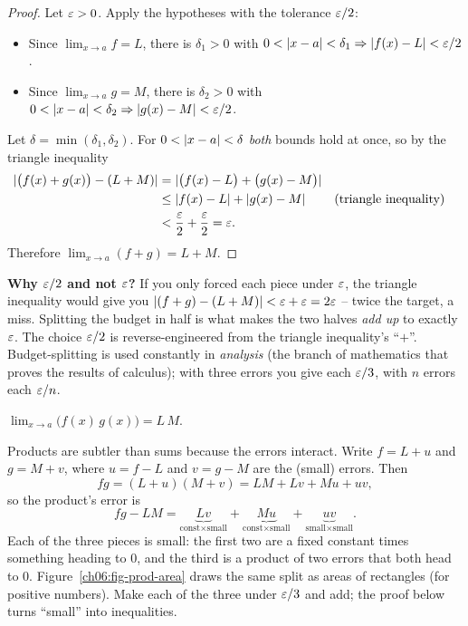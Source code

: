 \begin{proof}
Let $\varepsilon>0$. Apply the hypotheses with the tolerance $\varepsilon/2$:
\begin{itemize}
\item Since $\lim_{x\to a}f=L$, there is $\delta_1>0$ with
  $0<\lvert x-a\rvert<\delta_1 \Rightarrow \lvert f(x)-L\rvert<\varepsilon/2$.
\item Since $\lim_{x\to a}g=M$, there is $\delta_2>0$ with
  $0<\lvert x-a\rvert<\delta_2 \Rightarrow \lvert g(x)-M\rvert<\varepsilon/2$.
\end{itemize}
Let $\delta=\min(\delta_1,\delta_2)$. For $0<\lvert x-a\rvert<\delta$ \emph{both} bounds
hold at once, so by the triangle inequality
\begin{align*}
  \lvert\big(f(x)+g(x)\big)-(L+M)\rvert
  &= \lvert\big(f(x)-L\big)+\big(g(x)-M\big)\rvert \\
  &\le \lvert f(x)-L\rvert+\lvert g(x)-M\rvert && \text{(triangle inequality)} \\
  &< \frac{\varepsilon}{2}+\frac{\varepsilon}{2} = \varepsilon.
\end{align*}
Therefore $\lim_{x\to a}(f+g)=L+M$.
\end{proof}

\begin{trapbox}
\textbf{Why $\varepsilon/2$ and not $\varepsilon$?} If you only forced each piece under $\varepsilon$,
the triangle inequality would give you $\lvert(f+g)-(L+M)\rvert < \varepsilon+\varepsilon = 2\varepsilon$ --
twice the target, a miss. Splitting the budget in half is what makes the two
halves \emph{add up} to exactly $\varepsilon$. The choice $\varepsilon/2$ is reverse-engineered
from the triangle inequality's ``$+$''. Budget-splitting is used constantly in
\emph{analysis} (the branch of mathematics that proves the results of calculus);
with three errors you give each $\varepsilon/3$, with $n$ errors each $\varepsilon/n$.
\end{trapbox}

\begin{theorem}
\label{ch06:thm-prod}
$\displaystyle \lim_{x\to a}\big(f(x)\,g(x)\big) = L\,M.$
\end{theorem}

\begin{intuitionbox}
Products are subtler than sums because the errors interact. Write $f = L + u$ and
$g = M + v$, where $u=f-L$ and $v=g-M$ are the (small) errors. Then
\[
  fg = (L+u)(M+v) = LM + Lv + Mu + uv,
\]
so the product's error is
\[
  fg - LM = \underbrace{Lv}_{\text{const}\times\text{small}}
  + \underbrace{Mu}_{\text{const}\times\text{small}}
  + \underbrace{uv}_{\text{small}\times\text{small}}.
\]
Each of the three pieces is small: the first two are a fixed constant times
something heading to $0$, and the third is a product of two errors that both
head to $0$. Figure~\ref{ch06:fig-prod-area} draws the same split as areas of
rectangles (for positive numbers). Make each of the three under $\varepsilon/3$ and
add; the proof below turns ``small'' into inequalities.
\end{intuitionbox}

